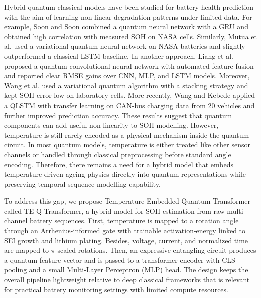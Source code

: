 \documentclass[a4paper,fleqn]{cas-sc}
\begin{document}
Hybrid quantum-classical models have been studied for battery health prediction with the aim of learning non-linear degradation patterns under limited data. For example, Soon and Soon \citep{soon2025hybrid} combined a quantum neural network with a GRU and obtained high correlation with measured SOH on NASA cells. Similarly, Mutua et al. \citep{mutua2025} used a variational quantum neural network on NASA batteries and slightly outperformed a classical LSTM baseline. In another approach, Liang et al. \citep{liang2025stochastic} proposed a quantum convolutional neural network with automated feature fusion and reported clear RMSE gains over CNN, MLP, and LSTM models. Moreover, Wang et al. \citep{wang2024lithium} used a variational quantum algorithm with a stacking strategy and kept SOH error low on laboratory cells. More recently, Wang and Kebede \citep{wang2026prediction} applied a QLSTM with transfer learning on CAN-bus charging data from 20 vehicles and further improved prediction accuracy. These results suggest that quantum components can add useful non-linearity to SOH modelling. However, temperature is still rarely encoded as a physical mechanism inside the quantum circuit. In most quantum models, temperature is either treated like other sensor channels or handled through classical preprocessing before standard angle encoding. Therefore, there remains a need for a hybrid model that embeds temperature-driven ageing physics directly into quantum representations while preserving temporal sequence modelling capability.

To address this gap, we propose Temperature-Embedded Quantum Transformer called TE-Q-Transformer, a hybrid model for SOH estimation from raw multi-channel battery sequences. First, temperature is mapped to a rotation angle through an Arrhenius-informed gate with trainable activation-energy linked to SEI growth and lithium plating. Besides, voltage, current, and normalized time are mapped to $\pi$-scaled rotations. Then, an expressive entangling circuit produces a quantum feature vector and is passed to a transformer encoder with CLS pooling and a small Multi-Layer Perceptron (MLP) head. The design keeps the overall pipeline lightweight relative to deep classical frameworks that is relevant for practical battery monitoring settings with limited compute resources.

\end{document}
